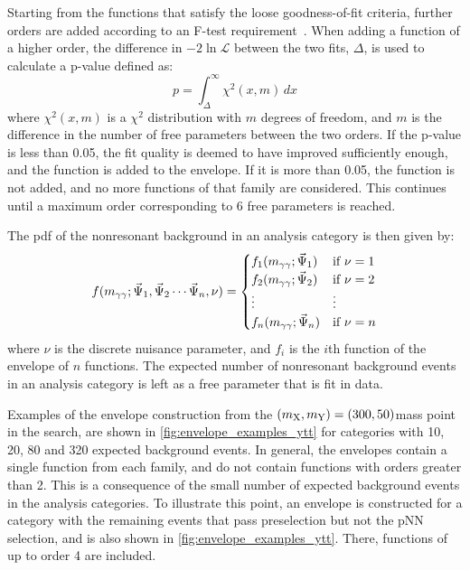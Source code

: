 Starting from the functions that satisfy the loose goodness-of-fit criteria, further orders are added according to an F-test requirement~\cite{10.2307/2340521}. When adding a function of a higher order, the difference in $-2\ln\mathcal{L}$ between the two fits, $\Delta$, is used to calculate a p-value defined as:
\begin{equation}
  p = \int_\Delta^\infty \chi^2(x, m)\,dx
\end{equation}
where $\chi^2(x,m)$ is a $\chi^2$ distribution with $m$ degrees of freedom, and $m$ is the difference in the number of free parameters between the two orders. If the p-value is less than 0.05, the fit quality is deemed to have improved sufficiently enough, and the function is added to the envelope. If it is more than 0.05, the function is not added, and no more functions of that family are considered. This continues until a maximum order corresponding to 6 free parameters is reached.

The pdf of the nonresonant background in an analysis category is then given by:
\begin{equation}
  f(m_{\gamma\gamma};\vec{\Psi}_1,\vec{\Psi}_2\cdots\vec{\Psi}_n,\nu) = \begin{cases}
    f_1(m_{\gamma\gamma};\vec{\Psi}_1) & \text{if } \nu=1 \\
    f_2(m_{\gamma\gamma};\vec{\Psi}_2) & \text{if } \nu=2 \\
    \vdots & \vdots \\
    f_n(m_{\gamma\gamma};\vec{\Psi}_n) & \text{if } \nu=n 
  \end{cases} 
\end{equation}
where $\nu$ is the discrete nuisance parameter, and $f_i$ is the $i$th function of the envelope of $n$ functions. The expected number of nonresonant background events in an analysis category is left as a free parameter that is fit in data.

Examples of the envelope construction from the $(m_{\mathrm{X}},m_{\mathrm{Y}})=(300,50)$\GeV mass point in the \XYttHgg search, are shown in \cref{fig:envelope_examples_ytt} for categories with 10, 20, 80 and 320 expected background events. In general, the envelopes contain a single function from each family, and do not contain functions with orders greater than 2. This is a consequence of the small number of expected background events in the analysis categories. To illustrate this point, an envelope is constructed for a category with the remaining events that pass preselection but not the pNN selection, and is also shown in \cref{fig:envelope_examples_ytt}. There, functions of up to order 4 are included. 


